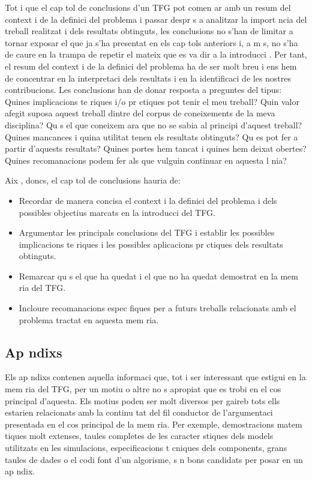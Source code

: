 Tot i que el cap tol de conclusions d'un TFG pot comen ar amb un resum del context i de la definici  del problema i passar despr s a analitzar la import ncia del treball realitzat i dels resultats obtinguts, les conclusions no s'han de limitar a tornar exposar el que ja s'ha presentat en els cap tols anteriors i, a m s, no s'ha de caure en la trampa de repetir el mateix que es va dir a la introducci  \cite{Pierson97}. Per tant, el resum del context i de la definici  del problema ha de ser molt breu i ens hem de concentrar en la interpretaci  dels resultats i en la identificaci  de les nostres contribucions. Les conclusions han de donar resposta a preguntes del tipus: Quines implicacions te riques i/o pr ctiques pot tenir el meu treball? Quin valor afegit suposa aquest treball dintre del corpus de coneixements de la meva disciplina? Qu   s el que coneixem ara que no se sabia al principi d'aquest treball? Quines mancances i quina utilitat tenen els resultats obtinguts? Qu  es pot fer a partir d'aquests resultats? Quines portes hem tancat i quines hem deixat obertes? Quines recomanacions podem fer als que vulguin continuar en aquesta l nia?

Aix , doncs, el cap tol de conclusions hauria de:
\begin{itemize}
   \item Recordar de manera concisa el context i la definici  del problema i dels possibles objectius marcats en la introducci  del TFG.

   \item Argumentar les principals conclusions del TFG i establir les possibles implicacions te riques i les possibles aplicacions pr ctiques dels resultats obtinguts.

   \item Remarcar qu   s el que ha quedat i el que no ha quedat demostrat en la mem ria del TFG.

   \item Incloure recomanacions espec fiques per a futurs treballs relacionats amb el problema tractat en aquesta mem ria.
\end{itemize}


\subsection{Ap ndixs}

Els ap ndixs contenen aquella informaci  que, tot i ser interessant que estigui en la mem ria del TFG, per un motiu o altre no  s apropiat que es trobi en el cos principal d'aquesta. Els motius poden ser molt diversos per  gaireb  tots ells estarien relacionats amb la continu tat del fil conductor de l'argumentaci  presentada en el cos principal de la mem ria. Per exemple, demostracions matem tiques molt extenses, taules completes de les caracter stiques dels models utilitzats en les simulacions, especificacions t cniques dels components, grans taules de dades o el codi font d'un algorisme, s n bons candidats per posar en un ap ndix.

